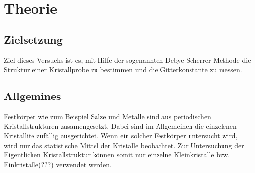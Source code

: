\section{Theorie}
\label{sec:Theorie}

\subsection{Zielsetzung}
\label{subsec:Zielsetzung}
Ziel dieses Versuchs ist es, mit Hilfe der sogenannten
Debye-Scherrer-Methode die Struktur einer Kristallprobe
zu bestimmen und die Gitterkonstante zu messen.

\subsection{Allgemines}
\label{subsec:allgemein}

Festkörper wie zum Beispiel Salze und Metalle
sind aus periodischen
Kristallstrukturen zusamengesetzt. Dabei sind im
Allgemeinen die einzelenen Kristallite zufällig
ausgerichtet. Wenn ein solcher Festkörper untersucht wird,
wird nur das statistische Mittel der Kristalle beobachtet.
Zur Untersuchung der Eigentlichen Kristallstruktur
können somit nur einzelne Kleinkristalle bzw.
Einkristalle(???) verwendet werden.



